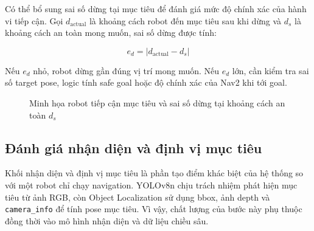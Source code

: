 Có thể bổ sung sai số dừng tại mục tiêu để đánh giá mức độ chính xác của hành vi tiếp cận. Gọi $d_{\mathrm{actual}}$ là khoảng cách robot đến mục tiêu sau khi dừng và $d_s$ là khoảng cách an toàn mong muốn, sai số dừng được tính:

\begin{equation}
    e_d
    =
    \left|
        d_{\mathrm{actual}}-d_s
    \right|
    \label{eq:stopping-distance-error}
\end{equation}

Nếu $e_d$ nhỏ, robot dừng gần đúng vị trí mong muốn. Nếu $e_d$ lớn, cần kiểm tra sai số target pose, logic tính safe goal hoặc độ chính xác của Nav2 khi tới goal.

\begin{figure}[H]
\centering
{}
\caption{Minh họa robot tiếp cận mục tiêu và sai số dừng tại khoảng cách an toàn $d_s$}
\label{fig:safe-distance-evaluation}
\end{figure}

\subsection{Đánh giá nhận diện và định vị mục tiêu}
\label{subsec:detection-localization-evaluation}

Khối nhận diện và định vị mục tiêu là phần tạo điểm khác biệt của hệ thống so với một robot chỉ chạy navigation. YOLOv8n chịu trách nhiệm phát hiện mục tiêu từ ảnh RGB, còn Object Localization sử dụng bbox, ảnh depth và \texttt{camera\_info} để tính pose mục tiêu. Vì vậy, chất lượng của bước này phụ thuộc đồng thời vào mô hình nhận diện và dữ liệu chiều sâu.

